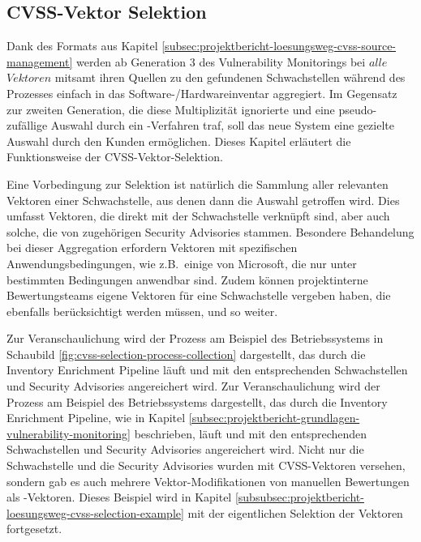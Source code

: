 \subsection{CVSS-Vektor Selektion} \label{subsec:projektbericht-loesungsweg-cvss-selection}

Dank des Formats aus Kapitel \ref{subsec:projektbericht-loesungsweg-cvss-source-management} werden ab Generation 3 des Vulnerability Monitorings bei {\metaeffekt} $alle$ $Vektoren$ mitsamt ihren Quellen zu den gefundenen Schwachstellen während des Prozesses einfach in das Software-/Hardwareinventar aggregiert.
Im Gegensatz zur zweiten Generation, die diese Multiplizität ignorierte und eine pseudo-zufällige Auswahl durch ein -Verfahren traf, soll das neue System eine gezielte Auswahl durch den Kunden ermöglichen.
Dieses Kapitel erläutert die Funktionsweise der CVSS-Vektor-Selektion.

Eine Vorbedingung zur Selektion ist natürlich die Sammlung aller relevanten Vektoren einer Schwachstelle, aus denen dann die Auswahl getroffen wird.
Dies umfasst Vektoren, die direkt mit der Schwachstelle verknüpft sind, aber auch solche, die von zugehörigen Security Advisories stammen.
Besondere Behandelung bei dieser Aggregation erfordern Vektoren mit spezifischen Anwendungsbedingungen, wie z.B.\ einige von Microsoft, die nur unter bestimmten Bedingungen anwendbar sind.
Zudem können projektinterne Bewertungsteams eigene Vektoren für eine Schwachstelle vergeben haben, die ebenfalls berücksichtigt werden müssen, und so weiter.

\ifshortenedReport
Zur Veranschaulichung wird der Prozess am Beispiel des Betriebssystems  in Schaubild \ref{fig:cvss-selection-process-collection} dargestellt, das durch die Inventory Enrichment Pipeline läuft und mit den entsprechenden Schwachstellen und Security Advisories angereichert wird.
\else
Zur Veranschaulichung wird der Prozess am Beispiel des Betriebssystems  dargestellt, das durch die Inventory Enrichment Pipeline, wie in Kapitel \ref{subsec:projektbericht-grundlagen-vulnerability-monitoring} beschrieben, läuft und mit den entsprechenden Schwachstellen und Security Advisories angereichert wird.
\fi
Nicht nur die Schwachstelle und die Security Advisories wurden mit CVSS-Vektoren versehen, sondern gab es auch mehrere Vektor-Modifikationen von manuellen Bewertungen als -Vektoren.
Dieses Beispiel wird in Kapitel \ref{subsubsec:projektbericht-loesungsweg-cvss-selection-example} mit der eigentlichen Selektion der Vektoren fortgesetzt.

